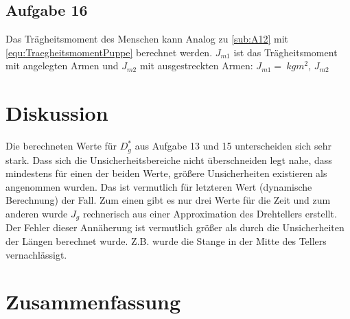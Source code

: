 \documentclass[a4paper,11pt,ngerman]{scrartcl}
\begin{document}
\subsection{Aufgabe 16}
Das Trägheitsmoment des Menschen kann Analog zu \cref{sub:A12} mit \cref{equ:TraegheitsmomentPuppe} berechnet werden. $J_{m1}$ ist das Trägheitsmoment mit angelegten Armen und $J_{m2}$ mit ausgestreckten Armen: $J_{m1} = \SI{}{kgm^2}$, $J_{m2}$

\section{Diskussion}
Die berechneten Werte für $D^*_g$ aus Aufgabe 13 und 15 unterscheiden sich sehr stark. Dass sich die Unsicherheitsbereiche nicht überschneiden legt nahe, dass mindestens für einen der beiden Werte, größere Unsicherheiten existieren als angenommen wurden. Das ist vermutlich für letzteren Wert (dynamische Berechnung) der Fall. Zum einen gibt es nur drei Werte für die Zeit und zum anderen wurde $J_g$ rechnerisch aus einer Approximation des Drehtellers erstellt. Der Fehler dieser Annäherung ist vermutlich größer als durch die Unsicherheiten der Längen berechnet wurde. Z.B. wurde die Stange in der Mitte des Tellers vernachlässigt.

\section{Zusammenfassung}



\end{document}
